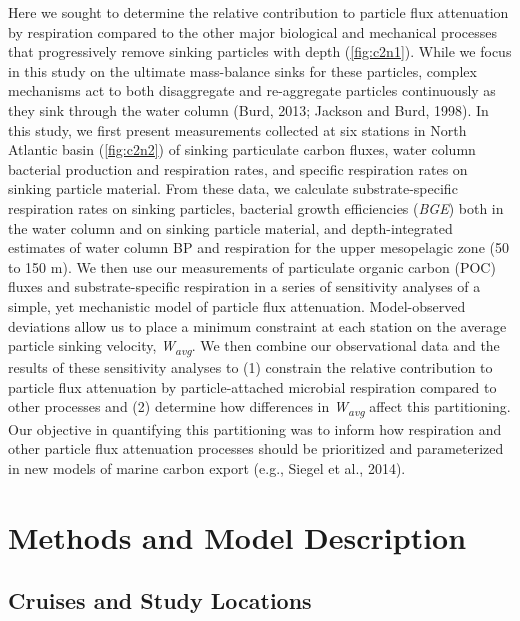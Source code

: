 Here we sought to determine the relative contribution to particle flux attenuation by respiration compared to the other major biological and mechanical processes that progressively remove sinking particles with depth (\autoref{fig:c2n1}). While we focus in this study on the ultimate mass-balance sinks for these particles, complex mechanisms act to both disaggregate and re-aggregate particles continuously as they sink through the water column (Burd, 2013; Jackson and Burd, 1998). In this study, we first present measurements collected at six stations in North Atlantic basin (\autoref{fig:c2n2}) of sinking particulate carbon fluxes, water column bacterial production and respiration rates, and specific respiration rates on sinking particle material. From these data, we calculate substrate-specific respiration rates on sinking particles, bacterial growth efficiencies (\emph{BGE}) both in the water column and on sinking particle material, and depth-integrated estimates of water column BP and respiration for the upper mesopelagic zone (50 to 150 m). We then use our measurements of particulate organic carbon (POC) fluxes and substrate-specific respiration in a series of sensitivity analyses of a simple, yet mechanistic model of particle flux attenuation. Model-observed deviations allow us to place a minimum constraint at each station on the average particle sinking velocity, \emph{W\textsubscript{avg}}. We then combine our observational data and the results of these sensitivity analyses to (1) constrain the relative contribution to particle flux attenuation by particle-attached microbial respiration compared to other processes and (2) determine how differences in \emph{W\textsubscript{avg}} affect this partitioning. Our objective in quantifying this partitioning was to inform how respiration and other particle flux attenuation processes should be prioritized and parameterized in new models of marine carbon export (e.g., Siegel et al., 2014).

\section{Methods and Model Description}

\subsection{Cruises and Study Locations}


